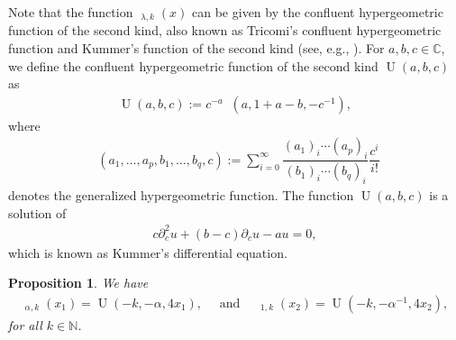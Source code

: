 \documentclass{amsart}
\newtheorem{Prop}[theorem]{Proposition}
\numberwithin{theorem}{section}
\theoremstyle{definition}
\theoremstyle{remark}
\def\N{\mathds{N} }
\def\C{\mathds{C} }
\DeclareMathOperator{\HypFdegen}{{}_2F_0}
\DeclareMathOperator{\HypFpq}{{}_pF_q}
\DeclareMathOperator{\KU}{U}
\DeclareMathOperator{\KO}{\widetilde U}
\newcommand{\pt}[1]{\partial_{#1}}
\begin{document}
Note that the function $\KO_{\lambda,k}(x)$ can be given by the confluent hypergeometric function of the second kind, also known as Tricomi's confluent hypergeometric function and Kummer's function of the second kind (see, e.g., \cite[Chapter 13]{AS}). For $a,b,c\in \C$, we define the confluent hypergeometric function of the second kind $\KU(a,b,c)$ as
\begin{align*}
\KU(a,b,c)  := c^{-a}\HypFdegen(a,1+a-b, -c^{-1}),
\end{align*}
where
\begin{align*}
\HypFpq (a_1,\ldots, a_p, b_1, \ldots, b_q,c) := \sum_{i=0}^\infty \dfrac{(a_1)_i\cdots (a_p)_i}{(b_1)_i\cdots (b_q)_i}\dfrac{c^i}{i!}
\end{align*}
denotes the generalized hypergeometric function. The function $\KU(a,b,c)$ is a solution of
\begin{align} \label{EqDiffKummer}
c\pt {c}^2 u +(b-c) \pt {c} u - au = 0,
\end{align}
which is known as Kummer's differential equation.

\begin{Prop}\label{EqKummer}
We have
\begin{align*}
\KO_{\alpha,k}(x_1) = \KU(-k,-\alpha,4x_1),  \quad \text{ and } \quad \KO_{1,k}(x_2) = \KU(-k,-\alpha^{-1},4x_2),
\end{align*}
for all $k\in\N$.
\end{Prop}
\end{document}
